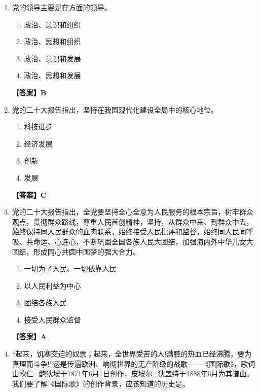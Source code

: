 \documentclass[UTF8,11pt,a4paper]{ctexart}
\begin{document}
\begin{enumerate}[label=\textbf{\arabic*.}, leftmargin=2.5em, itemsep=0.7em]
\begin{enumerate}[label=\Alph*., leftmargin=2em, itemsep=0.1em, topsep=0.15em]
\item 人才科技创新
\item 科技创新人才
\item 创新科技人才
\item 科技人才创新
\end{enumerate}
\textbf{【答案】D}
\item 党的领导主要是在\allowbreak\underline{\hspace{4em}}方面的领导。
\begin{enumerate}[label=\Alph*., leftmargin=2em, itemsep=0.1em, topsep=0.15em]
\item 政治、意识和组织
\item 政治、思想和组织
\item 政治、意识和发展
\item 政治、思想和发展
\end{enumerate}
\textbf{【答案】B}
\item 党的二十大报告指出，坚持\allowbreak\underline{\hspace{4em}}在我国现代化建设全局中的核心地位。
\begin{enumerate}[label=\Alph*., leftmargin=2em, itemsep=0.1em, topsep=0.15em]
\item 科技进步
\item 经济发展
\item 创新
\item 发展
\end{enumerate}
\textbf{【答案】C}
\item 党的二十大报告指出，全党要坚持全心全意为人民服务的根本宗旨，树牢群众观点，贯彻群众路线，尊重人民首创精神，坚持\allowbreak\underline{\hspace{4em}}，从群众中来、到群众中去，始终保持同人民群众的血肉联系，始终接受人民批评和监督，始终同人民同呼吸、共命运、心连心，不断巩固全国各族人民大团结，加强海内外中华儿女大团结，形成同心共圆中国梦的强大合力。
\begin{enumerate}[label=\Alph*., leftmargin=2em, itemsep=0.1em, topsep=0.15em]
\item 一切为了人民、一切依靠人民
\item 以人民利益为中心
\item 团结各族人民
\item 接受人民群众监督
\end{enumerate}
\textbf{【答案】A}
\item “起来，饥寒交迫的奴隶；起来，全世界受苦的人!满腔的热血已经沸腾，要为真理而斗争!”这是传遍欧洲、响彻世界的无产阶级的战歌——《国际歌》，歌词由欧仁·鲍狄埃于1871年6月1日创作，皮埃尔·狄盖特于1888年6月为其谱曲。我们要了解《国际歌》的创作背景，应该知道的历史是\allowbreak\underline{\hspace{4em}}。

\end{enumerate}
\end{document}
